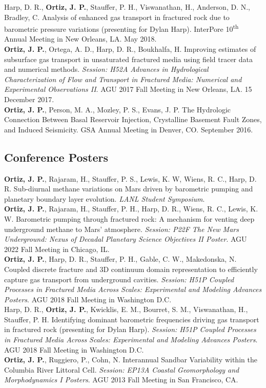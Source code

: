 \documentclass[11pt, letterpaper]{article}
\newcommand{\years}[1]{\marginnote{\scriptsize #1}}
\begin{document}
%
\years{2018}Harp, D. R., \textbf{Ortiz, J. P.}, Stauffer, P. H., Viswanathan,
H., Anderson, D. N., Bradley, C. Analysis of enhanced gas transport in
fractured rock due to barometric pressure variations (presenting for Dylan
Harp). InterPore 10\textsuperscript{th} Annual Meeting in New Orleans, LA. May
2018.\\
%
\years{2017}\textbf{Ortiz, J. P.}, Ortega, A. D., Harp, D. R., Boukhalfa, H.
Improving estimates of subsurface gas transport in unsaturated fractured media
using field tracer data and numerical methods.  \textit{Session: H52A Advances
    in Hydrological Characterization of Flow and Transport in Fractured Media:
Numerical and Experimental Observations II}. AGU 2017 Fall Meeting in New
Orleans, LA. 15 December 2017. \\
%
\years{2016}\textbf{Ortiz, J. P.}, Person, M. A., Mozley, P. S., Evans, J. P.
The Hydrologic Connection Between Basal Reservoir Injection, Crystalline
Basement Fault Zones, and Induced Seismicity.  GSA Annual Meeting in Denver,
CO. September 2016.\\


\subsection*{Conference Posters}
\years{2023}\textbf{Ortiz, J. P.}, Rajaram, H., Stauffer, P. S., Lewis, K. W,
Wiens, R. C., Harp, D. R. Sub-diurnal methane variations on Mars driven by
barometric pumping and planetary boundary layer evolution. \textit{LANL Student
Symposium}.\\
%
\years{2022}\textbf{Ortiz, J. P.}, Rajaram, H., Stauffer, P. H., Harp, D. R.,
Wiens, R. C., Lewis, K. W. Barometric pumping through fractured rock: A
mechanism for venting deep underground methane to Mars' atmosphere.
\textit{Session: P22F The New Mars Underground: Nexus of Decadal Planetary
Science Objectives II Poster}. AGU 2022 Fall Meeting in Chicago, IL.\\ 
%
\years{2018}\textbf{Ortiz, J. P.}, Harp, D. R., Stauffer, P. H., Gable, C. W.,
Makedonska, N. Coupled discrete fracture and 3D continuum domain representation
to efficiently capture gas transport from underground cavities.
\textit{Session: H51P Coupled Processes in Fractured Media Across Scales:
Experimental and Modeling Advances Posters}. AGU 2018 Fall Meeting in
Washington D.C.\\
%
\years{2018}Harp, D. R., \textbf{Ortiz, J. P.}, Kwicklis, E. M., Bourret, S.
M., Viswanathan, H., Stauffer, P. H. Identifying dominant barometric
frequencies driving gas transport in fractured rock 
(presenting for Dylan Harp). \textit{Session: H51P Coupled Processes in
Fractured Media Across Scales: Experimental and Modeling Advances Posters}. AGU
2018 Fall Meeting in Washington D.C.\\
%
\years{2013}\textbf{Ortiz, J. P.}, Ruggiero, P., Cohn, N. Interannual Sandbar
Variability within the Columbia River Littoral Cell.
\textit{Session: EP13A Coastal Geomorphology and Morphodynamics I Posters}.
AGU 2013 Fall Meeting in San Francisco, CA.
\end{document}
